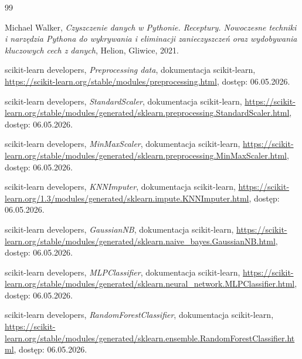 \def\bibname{\centerline{{\LARGE{LITERATURA}}}}

\begin {thebibliography}{99}

Michael Walker, {\it Czyszczenie danych w Pythonie. Receptury. Nowoczesne techniki i narzędzia Pythona do wykrywania i eliminacji zanieczyszczeń oraz wydobywania kluczowych cech z danych}, Helion, Gliwice, 2021.

scikit-learn developers, {\it Preprocessing data}, dokumentacja scikit-learn, \newline
\url{https://scikit-learn.org/stable/modules/preprocessing.html}, dostęp: 06.05.2026.

scikit-learn developers, {\it StandardScaler}, dokumentacja scikit-learn, \newline
\url{https://scikit-learn.org/stable/modules/generated/sklearn.preprocessing.StandardScaler.html}, dostęp: 06.05.2026.

scikit-learn developers, {\it MinMaxScaler}, dokumentacja scikit-learn, \newline
\url{https://scikit-learn.org/stable/modules/generated/sklearn.preprocessing.MinMaxScaler.html}, dostęp: 06.05.2026.

scikit-learn developers, {\it KNNImputer}, dokumentacja scikit-learn, \newline
\url{https://scikit-learn.org/1.3/modules/generated/sklearn.impute.KNNImputer.html}, dostęp: 06.05.2026.

scikit-learn developers, {\it GaussianNB}, dokumentacja scikit-learn, \newline
\url{https://scikit-learn.org/stable/modules/generated/sklearn.naive_bayes.GaussianNB.html}, dostęp: 06.05.2026.

scikit-learn developers, {\it MLPClassifier}, dokumentacja scikit-learn, \newline
\url{https://scikit-learn.org/stable/modules/generated/sklearn.neural_network.MLPClassifier.html}, dostęp: 06.05.2026.

scikit-learn developers, {\it RandomForestClassifier}, dokumentacja scikit-learn, \newline
\url{https://scikit-learn.org/stable/modules/generated/sklearn.ensemble.RandomForestClassifier.html}, dostęp: 06.05.2026.


\end{thebibliography}
